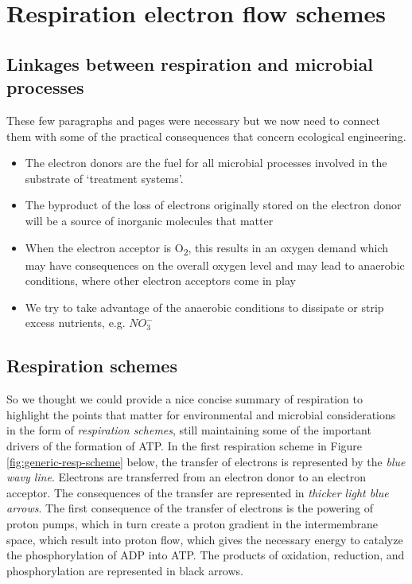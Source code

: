 \documentclass[]{book}
\providecommand{\tightlist}{%
  \setlength{\itemsep}{0pt}\setlength{\parskip}{0pt}}
\theoremstyle{definition}
\theoremstyle{definition}
\theoremstyle{definition}
\theoremstyle{remark}
\begin{document}
\section{Respiration electron flow
schemes}\label{respiration-electron-flow-schemes}

\subsection{Linkages between respiration and microbial
processes}\label{linkages-between-respiration-and-microbial-processes}

These few paragraphs and pages were necessary but we now need to connect
them with some of the practical consequences that concern ecological
engineering.

\begin{itemize}
\tightlist
\item
  The electron donors are the fuel for all microbial processes involved
  in the substrate of `treatment systems'.
\item
  The byproduct of the loss of electrons originally stored on the
  electron donor will be a source of inorganic molecules that matter
\item
  When the electron acceptor is O\textsubscript{2}, this results in an
  oxygen demand which may have consequences on the overall oxygen level
  and may lead to anaerobic conditions, where other electron acceptors
  come in play
\item
  We try to take advantage of the anaerobic conditions to dissipate or
  strip excess nutrients, e.g. \(NO_3^-\)
\end{itemize}

\subsection{Respiration schemes}\label{respiration-schemes}

So we thought we could provide a nice concise summary of respiration to
highlight the points that matter for environmental and microbial
considerations in the form of \emph{respiration schemes}, still
maintaining some of the important drivers of the formation of ATP. In
the first respiration scheme in Figure \ref{fig:generic-resp-scheme}
below, the transfer of electrons is represented by the \emph{blue wavy
line}. Electrons are transferred from an electron donor to an electron
acceptor. The consequences of the transfer are represented in
\emph{thicker light blue arrows}. The first consequence of the transfer
of electrons is the powering of proton pumps, which in turn create a
proton gradient in the intermembrane space, which result into proton
flow, which gives the necessary energy to catalyze the phosphorylation
of ADP into ATP. The products of oxidation, reduction, and
phosphorylation are represented in black arrows.
\end{document}
